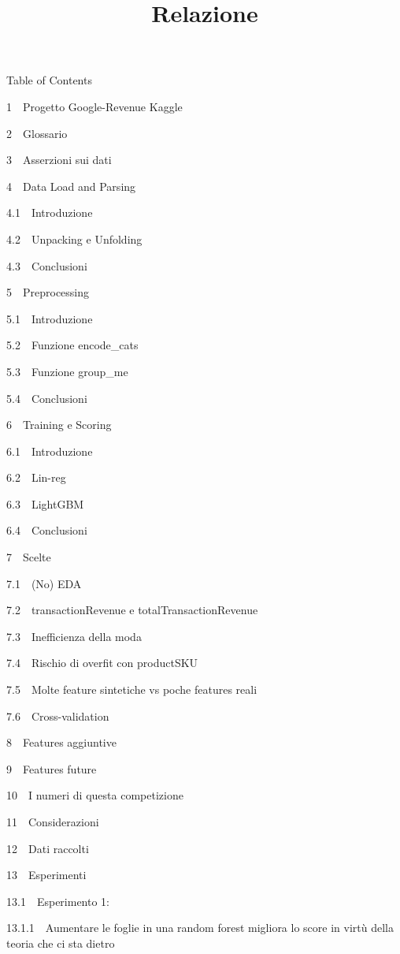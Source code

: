 \documentclass[11pt]{article}
\title{Relazione}
\begin{document}
    
    
    \maketitle
    
    

    
    Table of Contents{}

{{1~~}Progetto Google-Revenue Kaggle}

{{2~~}Glossario}

{{3~~}Asserzioni sui dati}

{{4~~}Data Load and Parsing}

{{4.1~~}Introduzione}

{{4.2~~}Unpacking e Unfolding}

{{4.3~~}Conclusioni}

{{5~~}Preprocessing}

{{5.1~~}Introduzione}

{{5.2~~}Funzione encode\_cats}

{{5.3~~}Funzione group\_me}

{{5.4~~}Conclusioni}

{{6~~}Training e Scoring}

{{6.1~~}Introduzione}

{{6.2~~}Lin-reg}

{{6.3~~}LightGBM}

{{6.4~~}Conclusioni}

{{7~~}Scelte}

{{7.1~~}(No) EDA}

{{7.2~~}transactionRevenue e totalTransactionRevenue}

{{7.3~~}Inefficienza della moda}

{{7.4~~}Rischio di overfit con productSKU}

{{7.5~~}Molte feature sintetiche vs poche features reali}

{{7.6~~}Cross-validation}

{{8~~}Features aggiuntive}

{{9~~}Features future}

{{10~~}I numeri di questa competizione}

{{11~~}Considerazioni}

{{12~~}Dati raccolti}

{{13~~}Esperimenti}

{{13.1~~}Esperimento 1:}

{{13.1.1~~}Aumentare le foglie in una random forest migliora lo score in
virtù della teoria che ci sta dietro}
\end{document}
